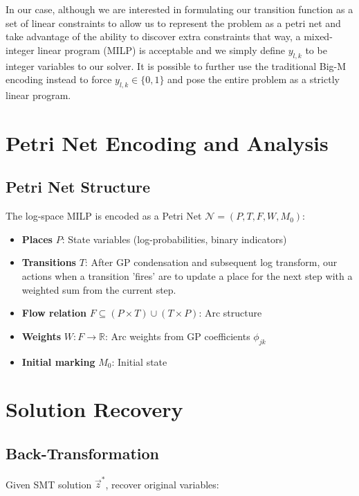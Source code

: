\documentclass[11pt]{article}
\newcommand{\R}{\mathbb{R}}
\begin{document}
In our case, although we are interested in formulating our transition
function as a set of linear constraints to allow us to represent the
problem as a petri net and take advantage of the ability to discover
extra constraints that way, a mixed-integer linear program (MILP) is
acceptable and we simply define $y_{l,k}$ to be integer variables to
our solver. It is possible to further use the traditional Big-M
encoding instead to force $y_{l,k} \in \{0,1\}$ and pose the entire
problem as a strictly linear program.

\section{Petri Net Encoding and Analysis}

\subsection{Petri Net Structure}

The log-space MILP is encoded as a Petri Net $\mathcal{N} = (P, T, F, W, M_0)$:

\begin{itemize}
    \item \textbf{Places} $P$: State variables (log-probabilities, binary indicators)
    \item \textbf{Transitions} $T$: After GP condensation
      and subsequent log transform, our actions when a transition
      'fires' are to update a place for the next step with a weighted
      sum from the current step.
    \item \textbf{Flow relation} $F \subseteq (P \times T) \cup (T \times P)$: Arc structure
    \item \textbf{Weights} $W: F \to \R$: Arc weights from GP coefficients $\phi_{jk}$
    \item \textbf{Initial marking} $M_0$: Initial state
\end{itemize}


\section{Solution Recovery}

\subsection{Back-Transformation}

Given SMT solution $\vec{z}^*$, recover original variables:
\end{document}
